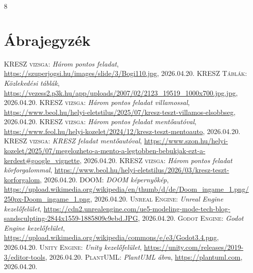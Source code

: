 \documentclass[
]{thesis-ekf}
\theoremstyle{definition}
\theoremstyle{remark}
\begin{document}
\begin{thebibliography}{8}
\chapter*{Ábrajegyzék}
\textsc{KRESZ vizsga}: \emph{Három pontos feladat}, \url{https://szuperjogsi.hu/images/slide/3/Bogi110.jpg}, 2026.04.20.
\textsc{KRESZ Táblák}: \emph{Közlekedési táblák}, \url{https://vezess2.p3k.hu/app/uploads/2007/02/2123_19519_1000x700.jpg.jpg}, 2026.04.20.
\textsc{KRESZ vizsga}: \emph{Három pontos feladat villamossal}, \url{https://www.beol.hu/helyi-eletstilus/2025/07/kresz-teszt-villamos-elsobbseg}, 2026.04.20.
\textsc{KRESZ vizsga}: \emph{Három pontos feladat mentőautóval}, \url{https://www.feol.hu/helyi-kozelet/2024/12/kresz-teszt-mentoauto}, 2026.04.20.
\textsc{KRESZ vizsga}: \emph{KRESZ feladat mentőautóval}, \url{https://www.szon.hu/helyi-kozelet/2025/07/megelozheto-a-mento-a-legtobben-bebukjak-ezt-a-kerdest#google_vignette}, 2026.04.20.
\textsc{KRESZ vizsga}: \emph{Három pontos feladat körforgalommal}, \url{https://www.beol.hu/helyi-eletstilus/2026/03/kresz-teszt-korforgalom}, 2026.04.20.
\textsc{DOOM}: \emph{DOOM képernyőkép}, \url{https://upload.wikimedia.org/wikipedia/en/thumb/d/de/Doom_ingame_1.png/250px-Doom_ingame_1.png}, 2026.04.20.
\textsc{Unreal Engine}: \emph{Unreal Engine kezelőfelület}, \url{https://cdn2.unrealengine.com/ue5-modeling-mode-tech-blog-sandsculpting-2844x1559-1885809c9ebd.JPG}, 2026.04.20.
\textsc{Godot Engine}: \emph{Godot Engine kezelőfelület}, \url{https://upload.wikimedia.org/wikipedia/commons/e/e3/Godot3.4.png}, 2026.04.20.
\textsc{Unity Engine}: \emph{Unity kezelőfelület}, \url{https://unity.com/releases/2019-3/editor-tools}, 2026.04.20.
\textsc{PlantUML}: \emph{PlantUML ábra}, \url{https://plantuml.com}, 2026.04.20.
\end{thebibliography}


\end{document}

